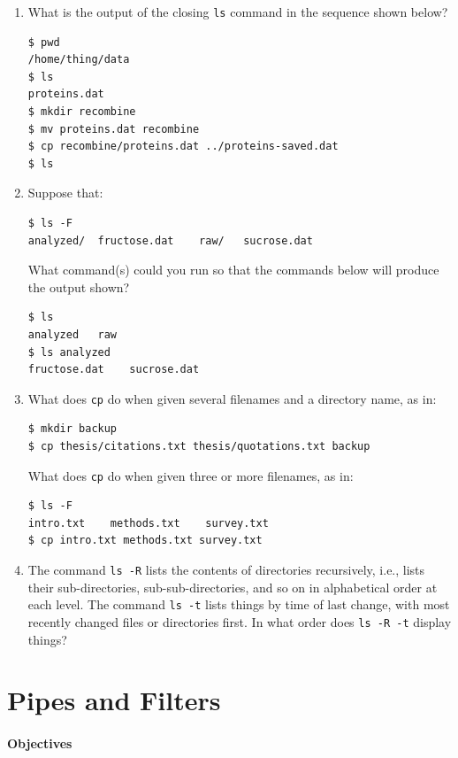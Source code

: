 \documentclass[]{book}
\begin{document}
\begin{enumerate}
\item
  What is the output of the closing \texttt{ls} command in the sequence
  shown below?

\begin{verbatim}
$ pwd
/home/thing/data
$ ls
proteins.dat
$ mkdir recombine
$ mv proteins.dat recombine
$ cp recombine/proteins.dat ../proteins-saved.dat
$ ls
\end{verbatim}
\item
  Suppose that:

\begin{verbatim}
$ ls -F
analyzed/  fructose.dat    raw/   sucrose.dat
\end{verbatim}

  What command(s) could you run so that the commands below will produce
  the output shown?

\begin{verbatim}
$ ls
analyzed   raw
$ ls analyzed
fructose.dat    sucrose.dat
\end{verbatim}
\item
  What does \texttt{cp} do when given several filenames and a directory
  name, as in:

\begin{verbatim}
$ mkdir backup
$ cp thesis/citations.txt thesis/quotations.txt backup
\end{verbatim}

  What does \texttt{cp} do when given three or more filenames, as in:

\begin{verbatim}
$ ls -F
intro.txt    methods.txt    survey.txt
$ cp intro.txt methods.txt survey.txt
\end{verbatim}
\item
  The command \texttt{ls -R} lists the contents of directories
  recursively, i.e., lists their sub-directories, sub-sub-directories,
  and so on in alphabetical order at each level. The command
  \texttt{ls -t} lists things by time of last change, with most recently
  changed files or directories first. In what order does
  \texttt{ls -R -t} display things?
\end{enumerate}

\section{Pipes and Filters}

\mbox{}\paragraph{Objectives}
\end{document}
